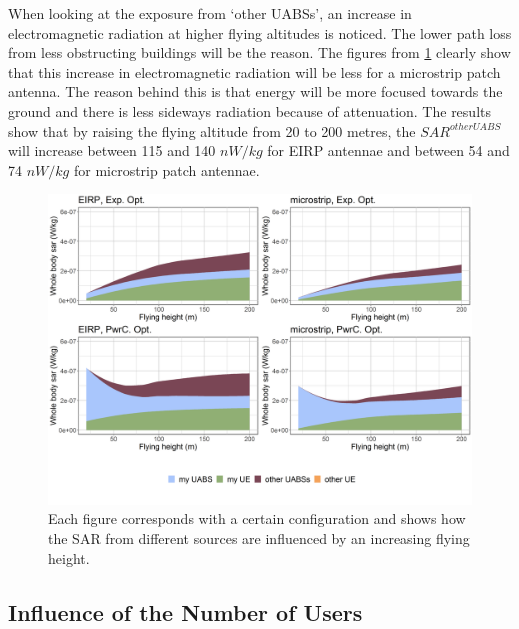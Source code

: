 When looking at the exposure from `other \gls{UABS}s', an increase in electromagnetic radiation at higher 
flying altitudes is noticed.
The lower path loss from less obstructing buildings will be the reason.
The figures from \ref{fig:s3a_fourSourcesMatrix} clearly show that this increase 
in electromagnetic radiation will be less for a microstrip patch antenna. The reason behind this is that energy 
will be more focused towards the ground and there is less sideways radiation because of attenuation.
The results show that by raising the flying altitude from 20 to 200 metres,
the $SAR^{otherUABS}$ will increase between 115 and 140 $nW/kg$ for \gls{EIRP} antennae and between 54 and 74 $nW/kg$ for microstrip patch antennae.

\clearpage
\begin{figure}[]
\centering
  \includegraphics[width=\textwidth]{../results/s3/fhFourSources.png}
  \caption{
  Each figure corresponds with a certain configuration and shows how the \acs{SAR} from different sources are influenced by an increasing flying height.}  
  \label{fig:s3a_fourSourcesMatrix}
\end{figure}
\subsection{Influence of the Number of Users}
\label{S3B}

